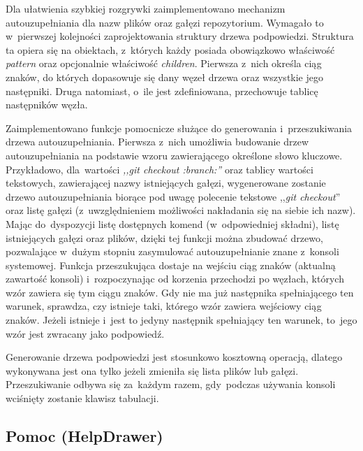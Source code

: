 \documentclass[12pt,a4paper,polish,thesis]{dcsbook}
\begin{document}
{	Dla ułatwienia szybkiej rozgrywki zaimplementowano mechanizm autouzupełniania dla nazw plików oraz gałęzi repozytorium. Wymagało to w~pierwszej kolejności zaprojektowania struktury drzewa podpowiedzi. Struktura ta opiera się na obiektach, z~których każdy posiada obowiązkowo właściwość \textit{pattern} oraz opcjonalnie właściwość \textit{children}. Pierwsza z~nich określa ciąg znaków, do których dopasowuje się dany węzeł drzewa oraz wszystkie jego następniki. Druga natomiast, o~ile jest zdefiniowana, przechowuje tablicę następników węzła.

	Zaimplementowano funkcje pomocnicze służące do generowania i~przeszukiwania drzewa autouzupełniania. Pierwsza z~nich umożliwia budowanie drzew autouzupełniania na podstawie wzoru zawierającego określone słowo kluczowe. Przykładowo, dla~wartości \textit{,,git checkout :branch:''} oraz tablicy wartości tekstowych, zawierającej nazwy istniejących gałęzi, wygenerowane zostanie drzewo autouzupełniania biorące pod uwagę polecenie tekstowe ,,\textit{git checkout}'' oraz listę gałęzi (z~uwzględnieniem możliwości nakładania się na siebie ich nazw). Mając do~dyspozycji listę dostępnych komend (w~odpowiedniej składni), listę istniejących gałęzi oraz plików, dzięki tej funkcji można zbudować drzewo, pozwalające w~dużym stopniu zasymulować autouzupełnianie znane z~konsoli systemowej. Funkcja przeszukująca dostaje na wejściu ciąg znaków (aktualną zawartość konsoli) i~rozpoczynając od korzenia przechodzi po węzłach, których wzór zawiera się tym ciągu znaków. Gdy nie ma już następnika spełniającego ten warunek, sprawdza, czy istnieje taki, którego wzór zawiera wejściowy ciąg znaków. Jeżeli istnieje i~jest to jedyny następnik spełniający ten warunek, to~jego wzór jest zwracany jako podpowiedź.

	Generowanie drzewa podpowiedzi jest stosunkowo kosztowną operacją, dlatego wykonywana jest ona tylko jeżeli zmieniła się lista plików lub gałęzi. Przeszukiwanie odbywa się za~każdym razem, gdy~podczas używania konsoli wciśnięty zostanie klawisz tabulacji.

	\subsection{Pomoc (HelpDrawer)}

}
\end{document}

